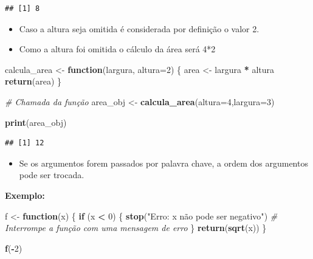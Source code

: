 \documentclass[
]{book}
\newenvironment{Shaded}{\begin{snugshade}}{\end{snugshade}}
\newcommand{\AttributeTok}[1]{\textcolor[rgb]{0.13,0.29,0.53}{#1}}
\newcommand{\CommentTok}[1]{\textcolor[rgb]{0.56,0.35,0.01}{\textit{#1}}}
\newcommand{\ControlFlowTok}[1]{\textcolor[rgb]{0.13,0.29,0.53}{\textbf{#1}}}
\newcommand{\DecValTok}[1]{\textcolor[rgb]{0.00,0.00,0.81}{#1}}
\newcommand{\FunctionTok}[1]{\textcolor[rgb]{0.13,0.29,0.53}{\textbf{#1}}}
\newcommand{\NormalTok}[1]{#1}
\newcommand{\OtherTok}[1]{\textcolor[rgb]{0.56,0.35,0.01}{#1}}
\newcommand{\SpecialCharTok}[1]{\textcolor[rgb]{0.81,0.36,0.00}{\textbf{#1}}}
\newcommand{\StringTok}[1]{\textcolor[rgb]{0.31,0.60,0.02}{#1}}
\providecommand{\tightlist}{%
  \setlength{\itemsep}{0pt}\setlength{\parskip}{0pt}}
\theoremstyle{definition}
\theoremstyle{definition}
\theoremstyle{definition}
\theoremstyle{definition}
\theoremstyle{remark}
\begin{document}
\begin{verbatim}
## [1] 8
\end{verbatim}

\begin{itemize}
\item
  Caso a altura seja omitida é considerada por definição o valor 2.
\item
  Como a altura foi omitida o cálculo da área será 4*2
\end{itemize}

\begin{Shaded}
\begin{Highlighting}[]
\NormalTok{calcula\_area }\OtherTok{\textless{}{-}} \ControlFlowTok{function}\NormalTok{(largura, }\AttributeTok{altura=}\DecValTok{2}\NormalTok{) \{ }
\NormalTok{        area }\OtherTok{\textless{}{-}}\NormalTok{ largura }\SpecialCharTok{*}\NormalTok{ altura  }
        \FunctionTok{return}\NormalTok{(area)}
\NormalTok{\}}

\CommentTok{\# Chamada da função}
\NormalTok{area\_obj }\OtherTok{\textless{}{-}} \FunctionTok{calcula\_area}\NormalTok{(}\AttributeTok{altura=}\DecValTok{4}\NormalTok{,}\AttributeTok{largura=}\DecValTok{3}\NormalTok{) }
    
\FunctionTok{print}\NormalTok{(area\_obj)}
\end{Highlighting}
\end{Shaded}

\begin{verbatim}
## [1] 12
\end{verbatim}

\begin{itemize}
\tightlist
\item
  Se os argumentos forem passados por palavra chave, a ordem dos argumentos pode ser trocada.
\end{itemize}

\textbf{Exemplo:}

\begin{Shaded}
\begin{Highlighting}[]
\NormalTok{f }\OtherTok{\textless{}{-}} \ControlFlowTok{function}\NormalTok{(x) \{}
  \ControlFlowTok{if}\NormalTok{ (x }\SpecialCharTok{\textless{}} \DecValTok{0}\NormalTok{) \{}
    \FunctionTok{stop}\NormalTok{(}\StringTok{"Erro: x não pode ser negativo"}\NormalTok{)  }\CommentTok{\# Interrompe a função com uma mensagem de erro}
\NormalTok{  \}}
  \FunctionTok{return}\NormalTok{(}\FunctionTok{sqrt}\NormalTok{(x))}
\NormalTok{\}}

\FunctionTok{f}\NormalTok{(}\SpecialCharTok{{-}}\DecValTok{2}\NormalTok{)}
\end{Highlighting}
\end{Shaded}
\end{document}
